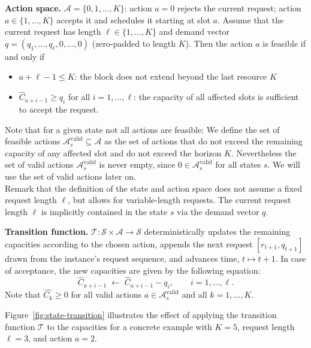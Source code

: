 \textbf{Action space.} $\mathcal{A} = \{0,1,\dots,K\}$: action $a=0$ rejects the current request; action $a \in \{1,\dots,K\}$ accepts it and schedules it starting at slot $a$.
Assume that the current request has length $\ell \in \{1,\dots,K\}$ and demand vector $q = (q_1,\dots,q_\ell,0,\dots,0)$ (zero-padded to length $K$). Then the action $a$ is feasible if and only if 
\begin{itemize}
 \item $a+\ell-1 \le K$: the block does not extend beyond the last resource $K$
 \item $\hat C_{a+i-1} \ge q_i$ for all $i=1,\dots,\ell$: the capacity of all affected slots is sufficient to accept the request.
\end{itemize} 
Note that for a given state not all actions are feasible: We define the  set of feasible actions $\mathcal{A}_s^{\text{valid}} \subseteq \mathcal{A}$ as the set of actions that do not exceed the remaining capacity of any affected slot and do not exceed the horizon $K$.
Nevertheless the set of valid actions $\mathcal{A}_s^{\text{valid}}$ is never empty, since $0 \in \mathcal{A}_s^{\text{valid}}$ for all states $s$.
We will use the set of valid actions later on.\\
Remark that the definition of the state and action space does not assume a fixed request length $\ell$, but allows for variable-length requests. The current request length $\ell$ is implicitly contained in the state $s$ via the demand vector $q$.

\textbf{Transition function.} $\mathcal{T}: \mathcal{S} \times \mathcal{A} \to \mathcal{S}$
deterministically updates the remaining capacities according to the chosen action, appends the next request
$[r_{t+1}, q_{t+1}]$ drawn from the instance's request sequence, and advances time, $t \mapsto t+1$. 
In case of acceptance, the new capacities are given by the following equation:
\[
  \hat C_{a+i-1} \;\leftarrow\; \hat C_{a+i-1} - q_i, \qquad i = 1,\dots,\ell.
\]
Note that $\hat{C_k} \geq 0$ for all valid actions $a \in \mathcal{A}_s^{\text{valid}}$ and all $k=1,\dots,K$.

Figure~\ref{fig:state-transition} illustrates the effect of applying the transition function $\mathcal{T}$ to the capacities for a concrete example with
$K=5$, request length $\ell=3$, and action $a=2$.

